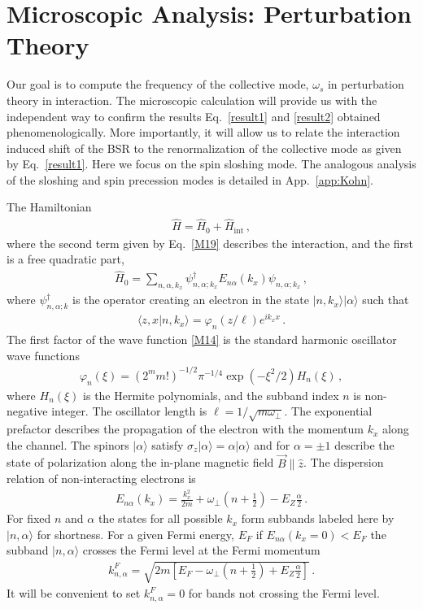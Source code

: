 \section{Microscopic Analysis: Perturbation Theory} 
\label{sec:Microscopic}
Our goal is to compute the frequency of the collective mode, $\omega_s$  in perturbation theory in interaction.
The microscopic calculation will provide us with the independent way to confirm the results Eq.~\eqref{result1} and \eqref{result2} obtained phenomenologically.
More importantly, it will allow us to relate the interaction induced shift of the BSR to the renormalization of the collective mode as given by Eq.~\eqref{result1}.
Here we focus on the spin sloshing mode.
The analogous analysis of the sloshing and spin precession modes is detailed in App.~\ref{app:Kohn}.


The Hamiltonian 
\begin{align}\label{M11}
\hat{H} = \hat{H}_0 + \hat{H}_{\mathrm{int}}\, ,
\end{align}
where the second term given by Eq.~\eqref{M19} describes the interaction, and the first is a free quadratic part,
\begin{align}\label{M13}
\hat{H}_0 = \sum_{n,\alpha,k_x} \psi_{n,\alpha;k_x}^{\dag} E_{n\alpha}(k_x)  \psi_{n,\alpha;k_x}\, ,
\end{align}
where  $\psi^{\dag}_{n,\alpha;k}$ is the operator creating an electron in the state $|n,k_x\rangle | \alpha \rangle$ such that
\begin{align}\label{M14}
\langle z,x |n,k_x \rangle  = \varphi_n(z/\ell) e^{i k_x x}  \, .
\end{align}
The first factor of the wave function \eqref{M14} is the standard harmonic oscillator wave functions  
\begin{align}\label{M14a}
\varphi_n(\xi) = (2^m m!)^{-1/2} \pi^{-1/4} \exp( - \xi^2/2  ) H_n( \xi )\, ,
\end{align}
where $H_n(\xi)$ is the Hermite polynomials, and the subband index $n$ is non-negative integer.
The oscillator length is $\ell = 1/ \sqrt{ m \omega_{\perp}}$.
The exponential prefactor describes the propagation of the electron with the momentum $k_x$ along the channel.
The spinors $|\alpha\rangle$ satisfy $\sigma_z |\alpha\rangle = \alpha |\alpha\rangle$ and for $\alpha = \pm 1$ describe the state of polarization along the in-plane magnetic field $\vec{B} \parallel \hat{z}$.
The dispersion relation of non-interacting electrons is 
\begin{align}\label{M17}
E_{n\alpha}(k_x) = \frac{k_x^2}{2 m } + \omega_{\perp} \left( n +\frac{1}{2}\right) - E_Z\frac{\alpha}{2} \, .
\end{align}
For fixed $n$ and $\alpha$ the states for all possible $k_x$ form subbands labeled here by $|n,\alpha\rangle$ for shortness.
For a given Fermi energy, $E_F$ if $E_{n\alpha}(k_x=0)  < E_F$ the subband $|n,\alpha \rangle$ crosses the Fermi level at the Fermi momentum
\begin{align}\label{kF}
k^F_{n,\alpha} = \sqrt{2 m \left[E_F - \omega_{\perp} \left( n +\frac{1}{2}\right) + E_Z\frac{\alpha}{2} \right] }\, .
\end{align}
It will be convenient to set $k^F_{n,\alpha} = 0$ for bands not crossing the Fermi level. 


